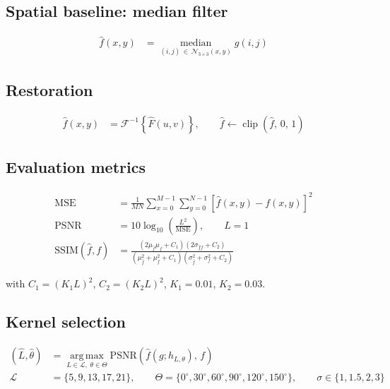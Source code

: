\documentclass[11pt]{article}
\begin{document}
\subsection*{Spatial baseline: median filter}

\begin{align}
  \hat{f}(x,y) &= \operatorname*{median}_{(i,j)\,\in\,\mathcal{N}_{3\times3}(x,y)} g(i,j)
\end{align}

\subsection*{Restoration}

\begin{align}
  \hat{f}(x,y) &= \mathcal{F}^{-1}\!\left\{\hat{F}(u,v)\right\},
  \qquad \hat{f} \leftarrow \operatorname{clip}\left(\hat{f},\, 0,\, 1\right)
\end{align}

\subsection*{Evaluation metrics}

\begin{align}
  \mathrm{MSE} &= \frac{1}{MN}\sum_{x=0}^{M-1}\sum_{y=0}^{N-1}
                  \left[\hat{f}(x,y) - f(x,y)\right]^{2} \\[4pt]
  \mathrm{PSNR} &= 10\log_{10}\!\left(\frac{L^{2}}{\mathrm{MSE}}\right),
                   \qquad L = 1 \\[4pt]
  \mathrm{SSIM}(\hat{f}, f)
    &= \frac{\left(2\mu_{\hat{f}}\mu_{f} + C_{1}\right)
             \left(2\sigma_{\hat{f}f} + C_{2}\right)}
            {\left(\mu_{\hat{f}}^{2} + \mu_{f}^{2} + C_{1}\right)
             \left(\sigma_{\hat{f}}^{2} + \sigma_{f}^{2} + C_{2}\right)}
\end{align}

\noindent with $C_{1} = (K_{1}L)^{2}$, $C_{2} = (K_{2}L)^{2}$, $K_{1} = 0.01$,
$K_{2} = 0.03$.

\subsection*{Kernel selection}

\begin{align}
  \left(\hat{L}, \hat{\theta}\right)
    &= \operatorname*{arg\,max}_{L \in \mathcal{L},\; \theta \in \Theta}
       \mathrm{PSNR}\!\left(\hat{f}\!\left(g; h_{L,\theta}\right),\, f\right) \\[4pt]
  \mathcal{L} &= \{5, 9, 13, 17, 21\},
  \qquad
  \Theta = \{0^{\circ}, 30^{\circ}, 60^{\circ}, 90^{\circ}, 120^{\circ}, 150^{\circ}\},
  \qquad
  \sigma \in \{1, 1.5, 2, 3\}
\end{align}
\end{document}
